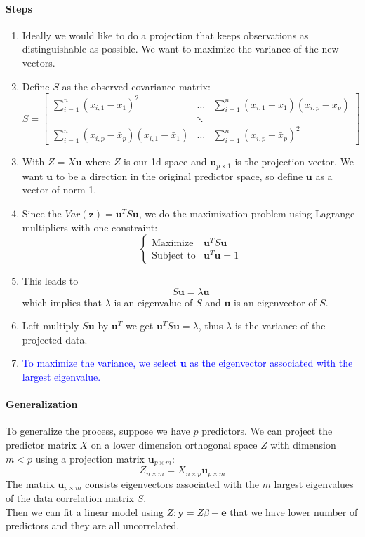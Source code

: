 \documentclass[11pt]{article}
\newcommand{\tb}[1]{\textbf{#1}}
\newcommand{\vy}[0]{\tb{y}}
\newcommand{\vz}[0]{\tb{z}}
\newcommand{\ve}[0]{\tb{e}}
\newcommand{\vu}[0]{\tb{u}}
\begin{document}
\paragraph{Steps}
\begin{enumerate}
	\item Ideally we would like to do a projection that keeps observations as distinguishable as possible. We want to maximize the variance of the new vectors.
	\item Define $S$ as the observed covariance matrix:
	$$ S = \begin{bmatrix}
		\sum_{i=1}^n (x_{i,1} - \bar{x}_1)^2 & \hdots & \sum_{i=1}^n(x_{i,1} - \bar{x}_1)(x_{i,p} - \bar{x}_p) \\
		&\ddots \\
		\sum_{i=1}^n (x_{i,p} - \bar{x}_p)(x_{i,1} - \bar{x}_1) &\hdots & \sum_{i=1}^n(x_{i,p} - \bar{x}_p)^2
	\end{bmatrix} $$
	\item With $Z = X\vu$ where $Z$ is our 1d space and $\vu_{p\times 1}$ is the projection vector. We want $\vu$ to be a direction in the original predictor space, so define $\vu$ as a vector of norm 1.
	\item Since the $Var(\vz) = \vu^TS\vu$, we do the maximization problem using Lagrange multipliers with one constraint:
	$$\begin{cases}
		\text{Maximize} & \vu^TS\vu  \\
		\text{Subject to} & \vu^T\vu = 1
	\end{cases} $$
	\item This leads to $$S\vu = \lambda\vu$$ which implies that $\lambda$ is an eigenvalue of $S$ and $\vu$ is an eigenvector of $S$.
	\item Left-multiply $S\vu$ by $\vu^T$ we get $\vu^TS\vu = \lambda$, thus $\lambda$ is the variance of the projected data.
	\item \textcolor{blue}{To maximize the variance, we select $\vu$ as the eigenvector associated with the largest eigenvalue.}
\end{enumerate}

\paragraph{Generalization}
To generalize the process, suppose we have $p$ predictors. We can project the predictor matrix $X$ on a lower dimension orthogonal space $Z$ with dimension $m < p$ using a projection matrix $\vu_{p\times m}$:
$$Z_{n\times m} = X_{n \times p}\vu_{p\times m}$$
The matrix $\vu_{p\times m}$ consists eigenvectors associated with the $m$ largest eigenvalues of the data correlation matrix $S$. \\
Then we can fit a linear model using $Z: \vy = Z\beta + \ve$ that we have lower number of predictors and they are all uncorrelated.
\end{document}
